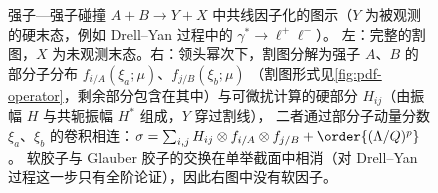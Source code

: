 \begin{figure}[htbp]
\caption{强子—强子碰撞 $A+B\to Y+X$ 中共线因子化的图示（$Y$ 为被观测的硬末态，例如 Drell--Yan 过程中的 $\gamma^*\to\ell^+\ell^-$）。
左：完整的割图，$X$ 为未观测末态。右：领头幂次下，割图分解为强子 $A$、$B$ 的部分子分布 $f_{i/A}(\xi_a;\mu)$、$f_{j/B}(\xi_b;\mu)$
（割图形式见\cref{fig:pdf-operator}，剩余部分包含在其中）与可微扰计算的硬部分 $H_{ij}$（由振幅 $H$ 与共轭振幅 $H^*$ 组成，$Y$ 穿过割线），
二者通过部分子动量分数 $\xi_a$、$\xi_b$ 的卷积相连：$\sigma=\sum_{i,j}H_{ij}\otimes f_{i/A}\otimes f_{j/B}+\order{(\Lambda/Q)^p}$。
软胶子与 Glauber 胶子的交换在单举截面中相消（对 Drell--Yan 过程这一步只有全阶论证），因此右图中没有软因子。}
\label{fig:factorization-schematic}
\end{figure}

